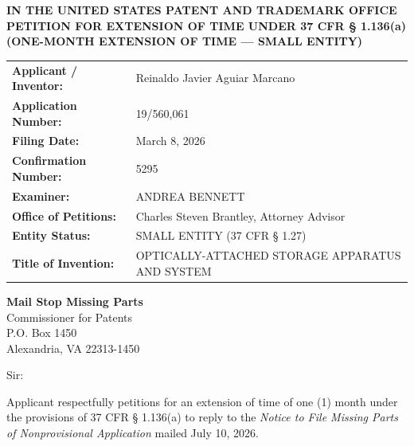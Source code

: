 \documentclass[11pt,letterpaper]{article}
\begin{document}
\thispagestyle{empty}

\begin{center}
    \textbf{\large IN THE UNITED STATES PATENT AND TRADEMARK OFFICE} \\
    \vspace{0.3cm}
    \textbf{\large PETITION FOR EXTENSION OF TIME UNDER 37 CFR \S{} 1.136(a)} \\
    \textbf{\normalsize (ONE-MONTH EXTENSION OF TIME --- SMALL ENTITY)}
\end{center}

\vspace{0.4cm}
\noindent\begin{tabular}{p{2.3in}p{4.0in}}
\textbf{Applicant / Inventor:} & Reinaldo Javier Aguiar Marcano \\
\textbf{Application Number:} & 19/560,061 \\
\textbf{Filing Date:} & March 8, 2026 \\
\textbf{Confirmation Number:} & 5295 \\
\textbf{Examiner:} & ANDREA BENNETT \\
\textbf{Office of Petitions:} & Charles Steven Brantley, Attorney Advisor \\
\textbf{Entity Status:} & SMALL ENTITY (37 CFR \S{} 1.27) \\
\textbf{Title of Invention:} & OPTICALLY-ATTACHED STORAGE APPARATUS AND SYSTEM \\
\end{tabular}

\vspace{0.5cm}
\noindent\textbf{Mail Stop Missing Parts} \\
Commissioner for Patents \\
P.O. Box 1450 \\
Alexandria, VA 22313-1450

\vspace{0.2cm}
Sir:

Applicant respectfully petitions for an extension of time of one (1) month under the provisions of 37 CFR \S{} 1.136(a) to reply to the \textit{Notice to File Missing Parts of Nonprovisional Application} mailed July 10, 2026.
\end{document}
